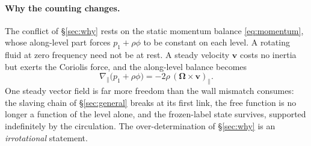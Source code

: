 \documentclass[11pt]{article}
\theoremstyle{definition}
\theoremstyle{remark}
\newcommand{\bv}{\mathbf{v}}
\newcommand{\bOmega}{\boldsymbol{\Omega}}
\begin{document}
\paragraph{Why the counting changes.} The conflict of \S\ref{sec:why}
rests on the static momentum balance \eqref{eq:momentum}, whose
along-level part forces $p_1 + \rho\phi$ to be constant on each level.
A rotating fluid at zero frequency need not be at rest. A steady
velocity $\bv$ costs no inertia but exerts the Coriolis force, and the
along-level balance becomes
\begin{equation*}
  \nabla_{\!\parallel}\bigl(p_1 + \rho\phi\bigr)
  = -2\rho\,(\bOmega\times\bv)_\parallel .
\end{equation*}
One steady vector field is far more freedom than the wall mismatch
consumes: the slaving chain of \S\ref{sec:general} breaks at its first
link, the free function is no longer a function of the level alone,
and the frozen-label state survives, supported indefinitely by the
circulation. The over-determination of \S\ref{sec:why} is an
\emph{irrotational} statement.
\end{document}
